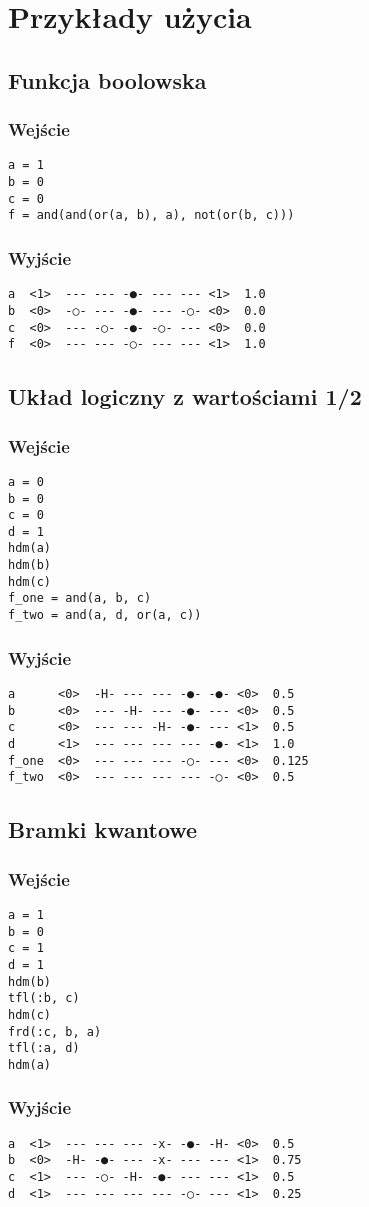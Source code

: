 \chapter{Przykłady użycia}
\thispagestyle{chapterBeginStyle}
\label{rozdzial4}
\section{Funkcja boolowska}
\subsection{Wejście}
\begin{verbatim}
a = 1
b = 0
c = 0
f = and(and(or(a, b), a), not(or(b, c)))
\end{verbatim}
\subsection{Wyjście}
\begin{verbatim}
a  <1>  --- --- -●- --- --- <1>  1.0
b  <0>  -○- --- -●- --- -○- <0>  0.0
c  <0>  --- -○- -●- -○- --- <0>  0.0
f  <0>  --- --- -○- --- --- <1>  1.0
\end{verbatim}
\section{Układ logiczny z wartościami 1/2}
\subsection{Wejście}
\begin{verbatim}
a = 0
b = 0
c = 0
d = 1
hdm(a)
hdm(b)
hdm(c)
f_one = and(a, b, c)
f_two = and(a, d, or(a, c))
\end{verbatim}
\subsection{Wyjście}
\begin{verbatim}
a      <0>  -H- --- --- -●- -●- <0>  0.5
b      <0>  --- -H- --- -●- --- <0>  0.5
c      <0>  --- --- -H- -●- --- <1>  0.5
d      <1>  --- --- --- --- -●- <1>  1.0
f_one  <0>  --- --- --- -○- --- <0>  0.125
f_two  <0>  --- --- --- --- -○- <0>  0.5
\end{verbatim}
\section{Bramki kwantowe}
\subsection{Wejście}
\begin{verbatim}
a = 1
b = 0
c = 1
d = 1
hdm(b)
tfl(:b, c)
hdm(c)
frd(:c, b, a)
tfl(:a, d)
hdm(a)
\end{verbatim}
\subsection{Wyjście}
\begin{verbatim}
a  <1>  --- --- --- -x- -●- -H- <0>  0.5
b  <0>  -H- -●- --- -x- --- --- <1>  0.75
c  <1>  --- -○- -H- -●- --- --- <1>  0.5
d  <1>  --- --- --- --- -○- --- <1>  0.25
\end{verbatim}